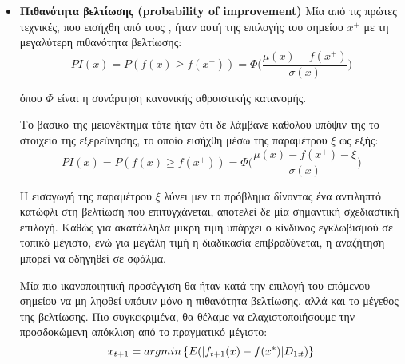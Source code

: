  	\begin{itemize}
 		\item \textbf{Πιθανότητα βελτίωσης (probability of improvement)} Μία από τις πρώτες τεχνικές, που εισήχθη από τους \citet{Kushner}, ήταν αυτή της επιλογής του σημείου $x^+$ με τη μεγαλύτερη πιθανότητα βελτίωσης:
 		\begin{equation}
 		PI(x)= P(f(x) \geq f(x^+)) = \Phi \Big(\frac{\mu(x) - f(x^+)}{\sigma(x)}\Big)
 		\end{equation}
 		
 		όπου $\Phi$ είναι η συνάρτηση κανονικής αθροιστικής κατανομής.
 		
 		Το βασικό της μειονέκτημα τότε ήταν ότι δε λάμβανε καθόλου υπόψιν της το στοιχείο της εξερεύνησης, το οποίο εισήχθη μέσω της παραμέτρου $\xi$ ως εξής:
 	    \begin{equation}
 	    PI(x)= P(f(x) \geq f(x^+)) = \Phi \Big(\frac{\mu(x) - f(x^+) - \xi}{\sigma(x)} \Big)
 	    \end{equation}
 		
 		Η εισαγωγή της παραμέτρου $\xi$ λύνει μεν το πρόβλημα δίνοντας ένα αντιληπτό κατώφλι στη βελτίωση που επιτυγχάνεται, αποτελεί δε μία σημαντική σχεδιαστική επιλογή. Καθώς για ακατάλληλα μικρή τιμή υπάρχει ο κίνδυνος εγκλωβισμού σε τοπικό μέγιστο, ενώ για μεγάλη τιμή η διαδικασία επιβραδύνεται, η αναζήτηση μπορεί να οδηγηθεί σε σφάλμα.
 		
 		Μία πιο ικανοποιητική προσέγγιση θα ήταν κατά την επιλογή του επόμενου σημείου να μη ληφθεί υπόψιν μόνο η πιθανότητα βελτίωσης, αλλά και το μέγεθος της βελτίωσης. Πιο συγκεκριμένα, θα θέλαμε να ελαχιστοποιήσουμε την προσδοκώμενη απόκλιση από το πραγματικό μέγιστο:
 		\begin{equation}
 		x_{t+1}= argmin \left \{ E(\lvert f_{t+1}(x) -f(x^*)\rvert D_{1:t}) \right \}
 		\end{equation}
 		

\end{itemize}
